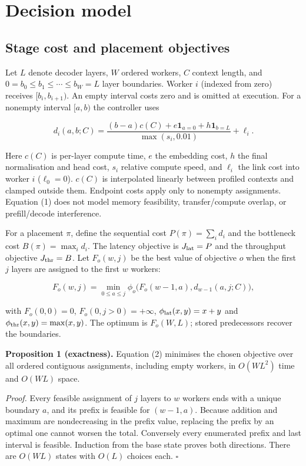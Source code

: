 \documentclass[preprint,12pt]{elsarticle}
\begin{document}
\hypertarget{decision-model}{%
\section{Decision model}\label{decision-model}}

\hypertarget{stage-cost-and-placement-objectives}{%
\subsection{Stage cost and placement
objectives}\label{stage-cost-and-placement-objectives}}

Let \(L\) denote decoder layers, \(W\) ordered workers, \(C\) context
length, and \(0=b_0\le b_1\le\cdots\le b_W=L\) layer boundaries. Worker
\(i\) (indexed from zero) receives \([b_i,b_{i+1})\). An empty interval
costs zero and is omitted at execution. For a nonempty interval
\([a,b)\) the controller uses

\[
d_i(a,b;C)=\frac{(b-a)c(C)+e\mathbf{1}_{a=0}+h\mathbf{1}_{b=L}}
 {\max(s_i,0.01)}+\ell_i. \tag{1}
\]

Here \(c(C)\) is per-layer compute time, \(e\) the embedding cost, \(h\)
the final normalisation and head cost, \(s_i\) relative compute speed,
and \(\ell_i\) the link cost into worker \(i\) (\(\ell_0=0\)). \(c(C)\)
is interpolated linearly between profiled contexts and clamped outside
them. Endpoint costs apply only to nonempty assignments. Equation (1)
does not model memory feasibility, transfer/compute overlap, or
prefill/decode interference.

For a placement \(\pi\), define the sequential cost
\(P(\pi)=\sum_i d_i\) and the bottleneck cost \(B(\pi)=\max_i d_i\). The
latency objective is \(J_{\rm lat}=P\) and the throughput objective
\(J_{\rm thr}=B\). Let \(F_o(w,j)\) be the best value of objective \(o\)
when the first \(j\) layers are assigned to the first \(w\) workers:

\[
F_o(w,j)=\min_{0\le a\le j}\phi_o\big(F_o(w-1,a),d_{w-1}(a,j;C)\big), \tag{2}
\]

with \(F_o(0,0)=0\), \(F_o(0,j>0)=+\infty\), \(\phi_{\rm lat}(x,y)=x+y\)
and \(\phi_{\rm thr}(x,y)=\max(x,y)\). The optimum is \(F_o(W,L)\);
stored predecessors recover the boundaries.

\textbf{Proposition 1 (exactness).} Equation (2) minimises the chosen
objective over all ordered contiguous assignments, including empty
workers, in \(O(WL^2)\) time and \(O(WL)\) space.

\emph{Proof.} Every feasible assignment of \(j\) layers to \(w\) workers
ends with a unique boundary \(a\), and its prefix is feasible for
\((w-1,a)\). Because addition and maximum are nondecreasing in the
prefix value, replacing the prefix by an optimal one cannot worsen the
total. Conversely every enumerated prefix and last interval is feasible.
Induction from the base state proves both directions. There are
\(O(WL)\) states with \(O(L)\) choices each. \(\square\)
\end{document}
